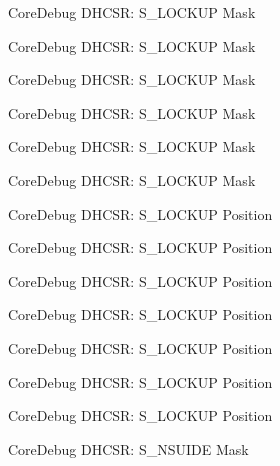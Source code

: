 \begin{DoxyRefList}
\label{deprecated__deprecated000114}%
%
Core\+Debug D\+H\+C\+SR\+: S\+\_\+\+L\+O\+C\+K\+UP Mask 

\label{deprecated__deprecated000168}%
%
Core\+Debug D\+H\+C\+SR\+: S\+\_\+\+L\+O\+C\+K\+UP Mask 

\label{deprecated__deprecated000253}%
%
Core\+Debug D\+H\+C\+SR\+: S\+\_\+\+L\+O\+C\+K\+UP Mask 

\label{deprecated__deprecated000310}%
%
Core\+Debug D\+H\+C\+SR\+: S\+\_\+\+L\+O\+C\+K\+UP Mask 

\label{deprecated__deprecated000386}%
%
Core\+Debug D\+H\+C\+SR\+: S\+\_\+\+L\+O\+C\+K\+UP Mask 

\label{deprecated__deprecated000473}%
%
Core\+Debug D\+H\+C\+SR\+: S\+\_\+\+L\+O\+C\+K\+UP Mask  
\item[Member \mbox{\hyperlink{group__CMSIS__CoreDebug_ga2900dd56a988a4ed27ad664d5642807e}{Core\+Debug\+\_\+\+D\+H\+C\+S\+R\+\_\+\+S\+\_\+\+L\+O\+C\+K\+U\+P\+\_\+\+Pos}} ]\label{deprecated__deprecated000021}%
%
Core\+Debug D\+H\+C\+SR\+: S\+\_\+\+L\+O\+C\+K\+UP Position 

\label{deprecated__deprecated000113}%
%
Core\+Debug D\+H\+C\+SR\+: S\+\_\+\+L\+O\+C\+K\+UP Position 

\label{deprecated__deprecated000167}%
%
Core\+Debug D\+H\+C\+SR\+: S\+\_\+\+L\+O\+C\+K\+UP Position 

\label{deprecated__deprecated000252}%
%
Core\+Debug D\+H\+C\+SR\+: S\+\_\+\+L\+O\+C\+K\+UP Position 

\label{deprecated__deprecated000309}%
%
Core\+Debug D\+H\+C\+SR\+: S\+\_\+\+L\+O\+C\+K\+UP Position 

\label{deprecated__deprecated000385}%
%
Core\+Debug D\+H\+C\+SR\+: S\+\_\+\+L\+O\+C\+K\+UP Position 

\label{deprecated__deprecated000472}%
%
Core\+Debug D\+H\+C\+SR\+: S\+\_\+\+L\+O\+C\+K\+UP Position  
\item[Member \mbox{\hyperlink{group__CMSIS__CoreDebug_gabe0164afd9f6b8800fb7e05280e0ecda}{Core\+Debug\+\_\+\+D\+H\+C\+S\+R\+\_\+\+S\+\_\+\+N\+S\+U\+I\+D\+E\+\_\+\+Msk}} ]\label{deprecated__deprecated000018}%
%
Core\+Debug D\+H\+C\+SR\+: S\+\_\+\+N\+S\+U\+I\+DE Mask 


\end{DoxyRefList}
